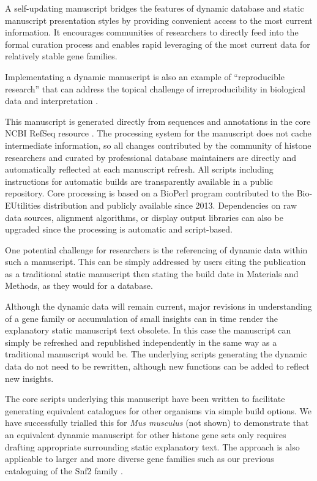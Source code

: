   A self-updating manuscript bridges the features of dynamic database and static manuscript
  presentation styles by providing convenient access to the most current information.
  It encourages communities of researchers to directly feed into the formal curation process
  and enables rapid leveraging of the most current data for relatively stable gene families.

  Implementating a dynamic manuscript is also an example of ``reproducible research''
  \citep{reproducible-research-bioinformatics,reproducible-research-law}
  that can address the topical challenge of irreproducibility in biological data
  and interpretation \citep{ErrorProne2012,OpenPrograms2012}.

  This manuscript is generated directly from sequences and annotations
  in the core NCBI RefSeq resource \citep{OLearyRefseq2016}.
  The processing system for the manuscript does not cache intermediate information,
  so all changes contributed by the community of histone researchers
  and curated by professional database maintainers
  are directly and automatically reflected at each manuscript refresh.
  All scripts including instructions for automatic builds
  are transparently available in a public repository.
  Core processing is based on a BioPerl program contributed to the Bio-EUtilities distribution
  and publicly available since 2013.
  Dependencies on raw data sources, alignment algorithms, or display output libraries
  can also be upgraded since the processing is automatic and script-based.

  One potential challenge for researchers is the referencing of dynamic data within such a manuscript.
  This can be simply addressed by users citing the publication as a traditional static manuscript
  then stating the build date in Materials and Methods, as they would for a database.

  Although the dynamic data will remain current,
  major revisions in understanding of a gene family or accumulation of small insights
  can in time render the explanatory static manuscript text obsolete.
  In this case the manuscript can simply be refreshed and republished independently
  in the same way as a traditional manuscript would be.
  The underlying scripts generating the dynamic data do not need to be rewritten,
  although new functions can be added to reflect new insights.

  The core scripts underlying this manuscript have been written to facilitate generating
  equivalent catalogues for other organisms via simple build options.
  We have successfully trialled this for \textit{Mus musculus} (not shown)
  to demonstrate that an equivalent dynamic manuscript for other histone gene sets
  only requires drafting appropriate surrounding static explanatory text.
  The approach is also applicable to larger and more diverse gene families such as
  our previous cataloguing of the Snf2 family \citep{andrew-snf2-catalogue}.
